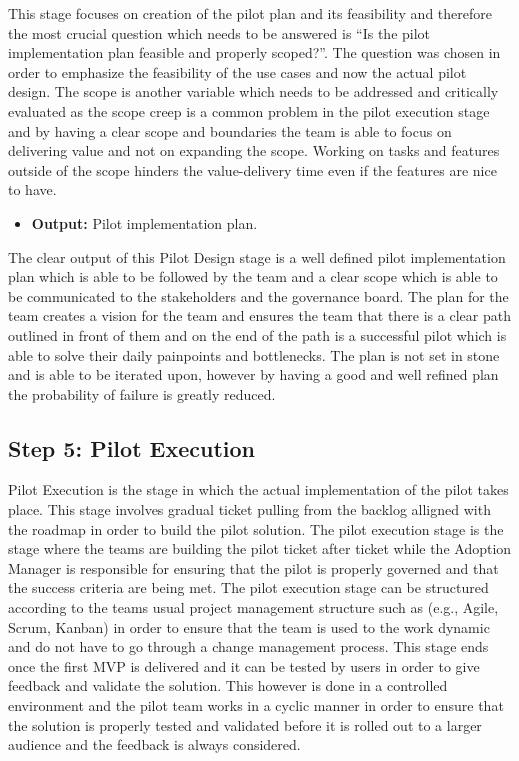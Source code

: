 \documentclass[]{imc-inf}
\def\tightlist{}
\begin{document}
This stage focuses on creation of the pilot plan and its feasibility and
therefore the most crucial question which needs to be answered is ``Is
the pilot implementation plan feasible and properly scoped?''. The
question was chosen in order to emphasize the feasibility of the use
cases and now the actual pilot design. The scope is another variable
which needs to be addressed and critically evaluated as the scope creep
is a common problem in the pilot execution stage and by having a clear
scope and boundaries the team is able to focus on delivering value and
not on expanding the scope. Working on tasks and features outside of the
scope hinders the value-delivery time even if the features are nice to
have.

\begin{itemize}
	\tightlist
	\item
	\textbf{Output:} Pilot implementation plan.
\end{itemize}

The clear output of this Pilot Design stage is a well defined pilot
implementation plan which is able to be followed by the team and a clear
scope which is able to be communicated to the stakeholders and the
governance board. The plan for the team creates a vision for the team
and ensures the team that there is a clear path outlined in front of
them and on the end of the path is a successful pilot which is able to
solve their daily painpoints and bottlenecks. The plan is not set in
stone and is able to be iterated upon, however by having a good and well
refined plan the probability of failure is greatly reduced.

\subsection{Step 5: Pilot
	Execution}\label{step-5-pilot-execution}

Pilot Execution is the stage in which the actual implementation of the
pilot takes place. This stage involves gradual ticket pulling from the
backlog alligned with the roadmap in order to build the pilot solution.
The pilot execution stage is the stage where the teams are building the
pilot ticket after ticket while the Adoption Manager is responsible for
ensuring that the pilot is properly governed and that the success
criteria are being met. The pilot execution stage can be structured
according to the teams usual project management structure such as (e.g.,
Agile, Scrum, Kanban) in order to ensure that the team is used to the
work dynamic and do not have to go through a change management process.
This stage ends once the first MVP is delivered and it can be tested by
users in order to give feedback and validate the solution. This however
is done in a controlled environment and the pilot team works in a cyclic
manner in order to ensure that the solution is properly tested and
validated before it is rolled out to a larger audience and the feedback
is always considered.
\end{document}
